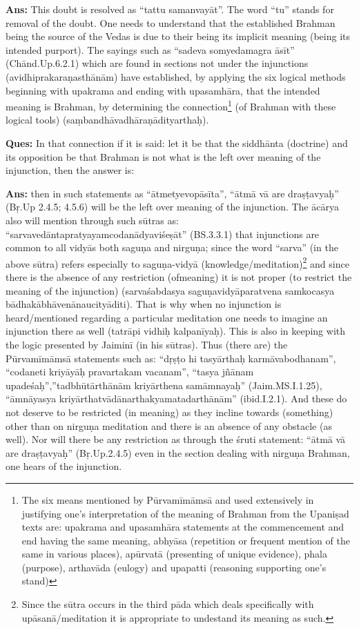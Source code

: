 \textbf{Ans:} This doubt is resolved as “tattu samanvayāt”. The word “tu” stands for removal of the doubt. One needs to understand that the established Brahman being the source of the Vedas is due to their being its implicit meaning (being its intended purport). The sayings such as “sadeva somyedamagra āsīt” (Chānd.Up.6.2.1) which are found in sections not under the injunctions (avidhiprakaraṇasthānām) have established, by applying the six logical methods beginning with upakrama and ending with upasamhāra, that the intended meaning is Brahman, by determining the connection\footnote{The six means mentioned by Pūrvamīmāmsā and used extensively in justifying one’s interpretation of the meaning of Brahman from the Upaniṣad texts are: upakrama and upasamhāra statements at the commencement and end having the same meaning, abhyāsa (repetition or frequent mention of the same in various places), apūrvatā (presenting of unique evidence), phala (purpose), arthavāda (eulogy) and upapatti (reasoning supporting one’s stand)} (of Brahman with these logical tools) (saṃbandhāvadhāraṇādityarthaḥ).

\textbf{Ques:} In that connection if it is said: let it be that the siddhānta (doctrine) and its opposition be that Brahman is not what is the left over meaning of the injunction, then the answer is: 

\textbf{Ans:} then in such statements as “ātmetyevopāsīta”, “ātmā vā are dra\-ṣṭavyaḥ” (Bṛ.Up 2.4.5; 4.5.6) will be the left over meaning of the injunction. The ācārya also will mention through such sūtras as: “sarvavedāntapratyayamcodanādyaviśeṣāt” (BS.3.3.1) that injunctions are common to all vidyās both saguṇa and nirguṇa; since the word “sarva” (in the above sūtra) refers especially to saguṇa-vidyā (knowledge/\-meditation)\footnote{Since the sūtra occurs in the third pāda which deals specifically with upāsanā/\-meditation it is appropriate to undestand its meaning as such.} and since there is the absence of any restriction (of\break meaning) it is not proper (to restrict the meaning of the injunction) (sarvaśabdasya saguṇavidyāparatvena samkocasya bādhakābhāvenānaucityāditi). That is why when no injunction is heard/mentioned regarding a particular meditation one needs to imagine an injunction there as well (tatrāpi vidhiḥ kalpanīyaḥ). This is also in keeping with the logic presented by Jaiminī (in his sūtras). Thus (there are) the  Pūrvamīmāmsā statements such as: “dṛṣṭo hi tasyārthaḥ karmāvabodhanam”, “codaneti kriyāyāḥ pravartakam vacanam”, “tasya jñānam upadeśaḥ”,”tadbhūtārthānām kriyārthena samāmnayaḥ” (Jaim.MS.\break\-I.1.25), “āmnāyasya kriyārthatvādānarthakyamatadarthānām” (ibid.\break\-I.2.1). And these do not deserve to be restricted (in meaning) as they incline towards (something) other than on nirguṇa meditation and there is an absence of any obstacle (as well). Nor will there be any restriction as through the śruti statement: “ātmā vā are draṣṭavyaḥ” (Bṛ.Up.2.4.5) even in the section dealing with nirguṇa Brahman, one hears of the injunction.

